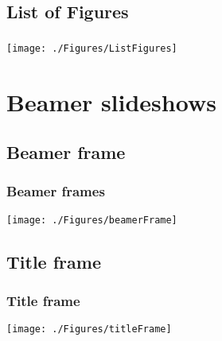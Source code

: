 \documentclass{beamer}
\begin{document}
\subsection{List of Figures}
\begin{frame}
\frametitle{}
\begin{center}
\begin{center}
    \texttt{[image: ./Figures/ListFigures]}
\end{center}
\end{center}
\end{frame}





\section{Beamer slideshows}
\subsection{Beamer frame}
\begin{frame}
\frametitle{Beamer frames}
\begin{center}
    \texttt{[image: ./Figures/beamerFrame]}
\end{center}
\end{frame}
\note{}


\subsection{Title frame}
\begin{frame}
\frametitle{Title frame}
\begin{center}
    \texttt{[image: ./Figures/titleFrame]}
\end{center}
\end{frame}
\note{}
\end{document}
